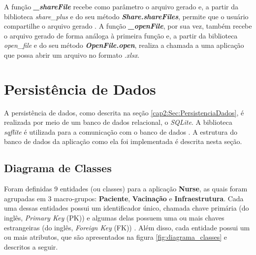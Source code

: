 A função \textbf{\textit{\_shareFile}} recebe como parâmetro o arquivo gerado e, a partir da biblioteca \textit{share\_plus} e do seu método \textbf{\textit{Share.shareFiles}}, permite que o usuário compartilhe o arquivo gerado \cite{share_plus-package}. A função \textbf{\textit{\_openFile}}, por sua vez, também recebe o arquivo gerado de forma análoga à primeira função e, a partir da biblioteca \textit{open\_file} e do seu método \textbf{\textit{OpenFile.open}}, realiza a chamada a uma aplicação que possa abrir um arquivo no formato \textit{.xlsx}.

\section{Persistência de Dados}
\label{cap4:Sec:PersistenciaDados}
A persistência de dados, como descrita na seção \ref{cap2:Sec:PersistenciaDados}, é realizada por meio de um banco de dados relacional, o \textit{SQLite}. A biblioteca \textit{sqflite} é utilizada para a comunicação com o banco de dados \cite{sqflite-package}. A estrutura do banco de dados da aplicação como ela foi implementada é descrita nesta seção.

\subsection{Diagrama de Classes}
\label{cap4:SubSec:DiagramaClasses}
Foram definidas 9 entidades (ou classes) para a aplicação \textbf{Nurse}, as quais foram agrupadas em 3 macro-grupos: \textbf{Paciente}, \textbf{Vacinação} e \textbf{Infraestrutura}. Cada uma dessas entidades possui um identificador único, chamada chave primária (do inglês, \textit{Primary Key} (PK)) e algumas delas possuem uma ou mais chaves estrangeiras (do inglês, \textit{Foreign Key} (FK)) \cite{heuser09banco}. Além disso, cada entidade possui um ou mais atributos, que são apresentados na figura \ref{fig:diagrama_classes} e descritos a seguir.

